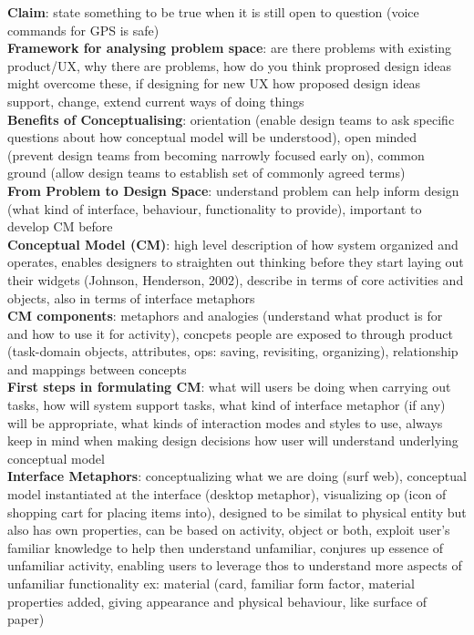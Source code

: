\documentclass[a4paper]{article}
\begin{document}
\begin{multicols}{2}
        \textbf{Claim}: state something to be true when it is still open to question (voice commands for GPS is safe)\\
        \textbf{Framework for analysing problem space}: are there problems with existing product/UX, why there are problems, how do you think proprosed design ideas might overcome these, if designing for new UX how proposed design ideas support, change, extend current ways of doing things\\
        \textbf{Benefits of Conceptualising}: orientation (enable design teams to ask specific questions about how conceptual model will be understood), open minded (prevent design teams from becoming narrowly focused early on), common ground (allow design teams to establish set of commonly agreed terms)\\
        \textbf{From Problem to Design Space}: understand problem can help inform design (what kind of interface, behaviour, functionality to provide), important to develop CM before\\
        \textbf{Conceptual Model (CM)}: high level description of how system organized and operates, enables designers to straighten out thinking before they start laying out their widgets (Johnson, Henderson, 2002), describe in terms of core activities and objects, also in terms of interface metaphors\\
        \textbf{CM components}: metaphors and analogies (understand what product is for and how to use it for activity), concpets people are exposed to through product (task-domain objects, attributes, ops: saving, revisiting, organizing), relationship and mappings between concepts\\
        \textbf{First steps in formulating CM}: what will users be doing when carrying out tasks, how will system support tasks, what kind of interface metaphor (if any) will be appropriate, what kinds of interaction modes and styles to use, always keep in mind when making design decisions how user will understand underlying conceptual model\\
        \textbf{Interface Metaphors}: conceptualizing what we are doing (surf web), conceptual model instantiated at the interface (desktop metaphor), visualizing op (icon of shopping cart for placing items into), designed to be similat to physical entity but also has own properties, can be based on activity, object or both, exploit user's familiar knowledge to help then understand unfamiliar, conjures up essence of unfamiliar activity, enabling users to leverage thos to understand more aspects of unfamiliar functionality ex: material (card, familiar form factor, material properties added, giving appearance and physical behaviour, like surface of paper)\\

\end{multicols}
\end{document}
